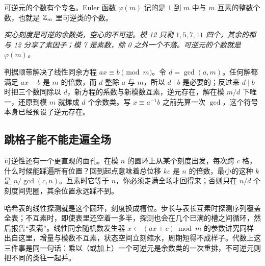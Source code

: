 可逆元的个数有个专名。Euler 函数 \(\varphi(m)\) 记的是 \(1\) 到 \(m\) 中与 \(m\) 互素的整数个数，也就是 \(\mathbb{Z}_m\) 里可逆类的个数。

\begin{center}

\emph{实心刻度是可逆的余数类，空心的不可逆。模 12 只剩 \(1,5,7,11\) 四个，其余的都与 12 分享了素因子；模 7 是素数，除 0 之外一个不落。可逆元的个数就是 \(\varphi(m)\)。}
\end{center}

判据顺带解决了线性同余方程 \(ax\equiv b\pmod m\)。令 \(d=\gcd(a,m)\)。任何解都满足 \(ax-b\) 是 \(m\) 的倍数，而 \(d\) 整除 \(a\) 与 \(m\)，所以 \(d\mid b\) 是必要的；反过来 \(d\mid b\) 时把三个数同除以 \(d\)，新方程的系数与新模数互素，逆元存在，解在模 \(m/d\) 下唯一，还原到模 \(m\) 就摊成 \(d\) 个余数类。写 \(x\equiv a^{-1}b\) 之前先算一次 \(\gcd\)，这个符号本身已经预设了逆元存在。

\subsection{跳格子能不能走遍全场}

可逆性还有一个更直观的面孔。在模 \(n\) 的圆环上从某个刻度出发，每次跨 \(c\) 格，什么时候能踩遍所有位置？回到起点意味着总位移 \(kc\) 是 \(n\) 的倍数，最小的这种 \(k\) 是 \(n/\gcd(c,n)\)。互素时它等于 \(n\)，你必须走满全场才回得来；否则只在 \(n/d\) 个刻度间兜圈，其余位置永远踩不到。

哈希表的线性探测就是这个圆环，刻度换成槽位。步长与表长互素时探测序列覆盖全表；不互素时，即使表里还空着一多半，探测也会在几个已满的槽之间循环，然后报告``表满''。线性同余随机数发生器 \(x\leftarrow(ax+c)\bmod m\) 的参数讲究同样出自这里，增量与模数不互素，状态空间立刻缩水，周期短得不成样子。代数上这三件事是同一句话：乘以（或加上）一个可逆元是余数类的一次重排，不可逆元则把不同的类往一起并。

